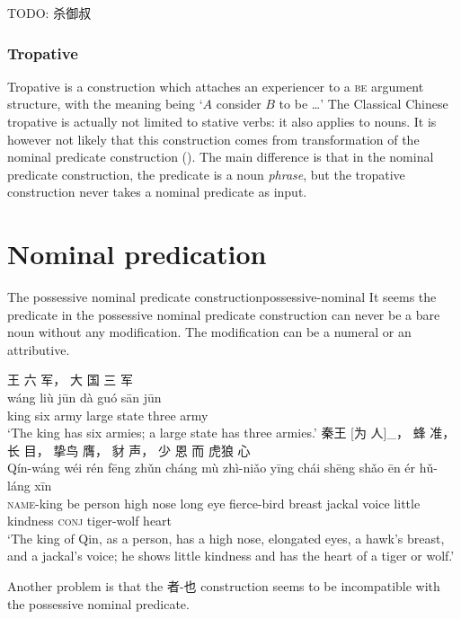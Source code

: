 \documentclass[UTF8, a4paper, oneside, scheme=plain, 12pt]{ctexrep}
\newcommand*{\citepages}[1]{pp.~{#1}}
\newcommand{\translate}[1]{`#1'}
\newcommand*{\category}[1]{\textsc{#1}}
\begin{document}
TODO: 杀御叔

\subsection{Tropative}

Tropative is a construction which attaches an experiencer to a \category{be} argument structure,
with the meaning being \translate{$A$ consider $B$ to be \dots}
\citep[\citepages{413-414}]{meiguang2018}
The Classical Chinese tropative is actually not limited to stative verbs:
it also applies to nouns.
It is however not likely that this construction comes from transformation of the nominal predicate construction
().
The main difference is that in the nominal predicate construction,
the predicate is a noun \emph{phrase},
but the tropative construction never takes a nominal predicate as input.

\chapter{Nominal predication}

\begin{todobox}{The possessive nominal predicate construction}{possessive-nominal}
    It seems the predicate in the possessive nominal predicate construction
    can never be a bare noun without any modification.
    The modification can be a numeral or an attributive.

    \begin{exe}
        \ex
        \glll 王 六 军， 大 国 三 军 \\
        wáng liù jūn dà guó sān jūn \\
        king six army large state three army \\
        \glt\translate{The king has six armies; a large state has three armies.}
        \ex
        \glll 秦王 [为 人]_{}， 蜂 准， 长 目， 挚鸟 膺， 豺 声， 少 恩 而 虎狼 心 \\
        Qín-wáng wéi rén fēng zhǔn cháng mù zhì-niǎo yīng chái shēng shǎo ēn ér hǔ-láng xīn \\
        \category{name}-king be person high nose long eye fierce-bird breast jackal voice little kindness \category{conj} tiger-wolf heart \\
        \glt\translate{The king of Qin, as a person, has a high nose, elongated eyes, a hawk's breast, and a jackal's voice; he shows little kindness and has the heart of a tiger or wolf.}
    \end{exe}
    
    Another problem is that the 者-也 construction seems to be incompatible with the possessive nominal predicate.
\end{todobox}
\end{document}
